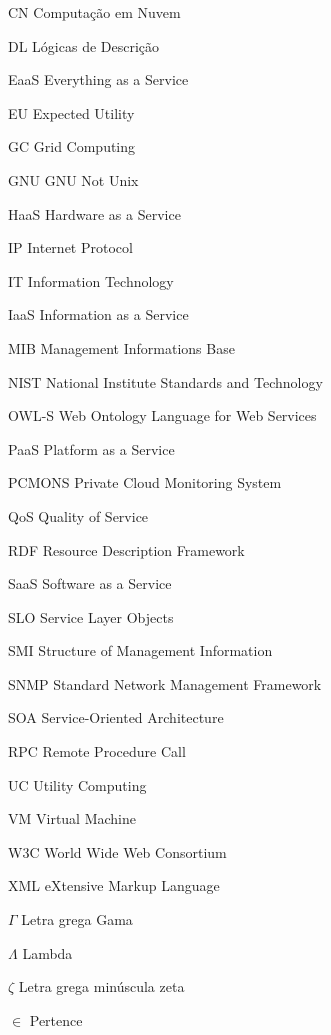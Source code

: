 \documentclass[12pt,openright,twoside,a4paper,english,brazil]{abntex2}
\begin{document}
\begin{siglas}
  \item[CN] Computação em Nuvem
  \item[DL] Lógicas de Descrição
  \item[EaaS] Everything as a Service
  \item[EU] Expected Utility
  \item[GC] Grid Computing
  \item[GNU] GNU Not Unix
  \item[HaaS] Hardware as a Service
  \item[IP] Internet Protocol
  \item[IT] Information Technology
  \item[IaaS] Information as a Service
  \item[MIB] Management Informations Base
  \item[NIST] National Institute Standards and Technology
  \item[OWL-S] Web Ontology Language for Web Services
  \item[PaaS] Platform as a Service
  \item[PCMONS] Private Cloud Monitoring System
  \item[QoS] Quality of Service
  \item[RDF] Resource Description Framework
  \item[SaaS] Software as a Service 
  \item[SLO] Service Layer Objects
  \item[SMI] Structure of Management Information
  \item[SNMP] Standard Network Management Framework
  \item[SOA] Service-Oriented Architecture
  \item[RPC] Remote Procedure Call
  \item[UC] Utility Computing
  \item[VM] Virtual Machine
  \item[W3C] World Wide Web Consortium
  \item[XML] eXtensive Markup Language  
\end{siglas}


\begin{simbolos}
  \item[$ \Gamma $] Letra grega Gama
  \item[$ \Lambda $] Lambda
  \item[$ \zeta $] Letra grega minúscula zeta
  \item[$ \in $] Pertence
\end{simbolos}
\end{document}
